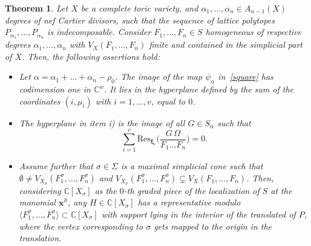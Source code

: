 \documentclass[a4paper,11pt]{amsart}
\newcommand{\C}{\mathbb{C}}
\newcommand{\bfx}{{\boldsymbol{x}}}
\newcommand{\bfxi}{{\boldsymbol{\xi}}}
\newcounter{thm}
\numberwithin{thm}{section}
\numberwithin{equation}{section}
\theoremstyle{definition}
\theoremstyle{plain}
\newtheorem{theorem}[thm]{Theorem}
\begin{document}
\begin{theorem}\label{oa}
Let $X$ be a complete toric variety, and $\alpha_1,\ldots, \alpha_n\in A_{n-1}(X)$ degrees of nef Cartier divisors, such that the sequence of lattice polytopes $P_{\alpha_1},\ldots, P_{\alpha_n}$ is indecomposable. 
Consider $F_1,\ldots, F_n\in S$ homogeneous  of respective degrees $\alpha_1,\ldots, \alpha_n$ with $V_X(F_1,\ldots, F_n)$ 
finite and contained in the simplicial part of $X$. Then, the following assertions hold: 
\begin{itemize}
\item[(i)] Let  $\alpha=\alpha_1+\ldots+\alpha_n-\rho_0$.  The image of the map $\psi_\alpha$ in~\eqref{square} has codimension one in $\C^w$. It lies in the hyperplane defined by the sum of the coordinates $(i, \mu_i)$ with $i=1, \dots, v$, equal to $0$.
\item[(ii)] The hyperplane in item i) is the image  of all  $G\in S_\alpha$ such that
$$\sum_{i=1}^v\mbox{Res}_{\bfxi_i}\Big(\frac{G\,\Omega}{F_1\ldots F_n}\Big)=0.
$$

\item[(iii)]
Assume further that $\sigma\in\Sigma$ is a maximal simplicial cone such that  $\emptyset\neq V_{X_\sigma}(F_1^\sigma, \ldots, F_n^\sigma)$ and
$V_{X_\sigma}(F_1^\sigma, \ldots, F_n^\sigma)\subsetneq V_{X}(F_1,\ldots, F_n)$. 
Then, considering $\C[X_\sigma]$ as the $0$-th graded piece of the localization of $S$ at the monomial $\bfx^{\widehat{\sigma}}$, any $H\in\C[X_\sigma]$ has a representative  modulo $\langle F_1^\sigma,\ldots, F_n^\sigma\rangle\subset\C[X_\sigma]$ with support lying in the interior of the translated of $P$,
 where the vertex corresponding to $\sigma$ gets mapped to the origin in the translation.
 \end{itemize}
\end{theorem}
\end{document}
